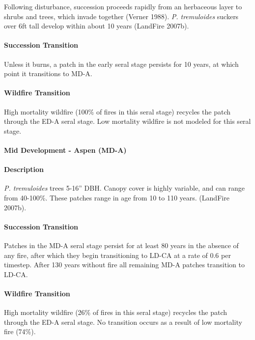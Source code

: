 Following disturbance, succession proceeds rapidly from an herbaceous layer to shrubs and trees, which invade together (Verner 1988). \emph{P. tremuloides} suckers over 6ft tall develop within about 10 years (LandFire 2007b). 

\paragraph{Succession Transition} Unless it burns, a patch in the early seral stage persists for 10 years, at which point it transitions to MD-A.

\paragraph{Wildfire Transition} High mortality wildfire (100\% of fires in this seral stage) recycles the patch through the ED-A seral stage. Low mortality wildfire is not modeled for this seral stage.

\noindent\hrulefill


\paragraph{Mid Development - Aspen (MD-A)}

\paragraph{Description} \emph{P. tremuloides} trees 5-16'' DBH. Canopy cover is highly variable, and can range from 40-100\%. These patches range in age from 10 to 110 years. (LandFire 2007b).

\paragraph{Succession Transition} Patches in the MD-A seral stage persist for at least 80 years in the absence of any fire, after which they begin transitioning to LD-CA at a rate of 0.6 per timestep. After 130 years without fire all remaining MD-A patches transition to LD-CA. 

\paragraph{Wildfire Transition} High mortality wildfire (26\% of fires in this seral stage) recycles the patch through the ED-A seral stage. No transition occurs as a result of low mortality fire (74\%).

